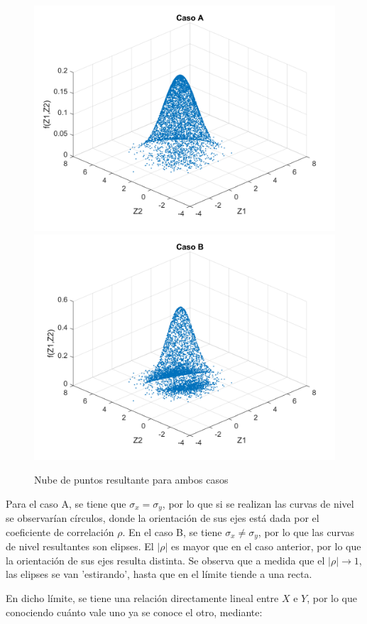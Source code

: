 \begin{figure}[!ht]
\begin{centering}
\includegraphics[scale=0.55]{Imagenes/Za.png}
\includegraphics[scale=0.55]{Imagenes/Zb.png}
\par\end{centering}
\caption{Nube de puntos resultante para ambos casos}

\end{figure} 

Para el caso A, se tiene que $\sigma_x = \sigma_y$, por lo que si se realizan las curvas de nivel se observar\'ian c\'irculos, donde la orientaci\'on de sus ejes est\'a dada por el coeficiente de correlaci\'on $\rho$. En el caso B, se tiene $\sigma_x \neq \sigma_y$, por lo que las curvas de nivel resultantes son elipses. El $|\rho|$ es mayor que en el caso anterior, por lo que la orientaci\'on de sus ejes resulta distinta. Se observa que a medida que el $|\rho| \longrightarrow 1$, las elipses se van 'estirando', hasta que en el l\'imite tiende a una recta.\par
En dicho l\'imite, se tiene una relaci\'on directamente lineal entre $X$ e $Y$, por lo que conociendo cu\'anto vale uno ya se conoce el otro, mediante:

